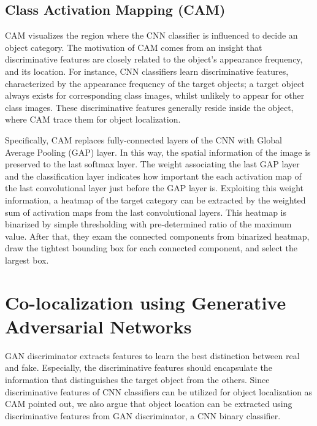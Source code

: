 \documentclass[runningheads]{llncs}
\begin{document}
\subsection{Class Activation Mapping (CAM)}

CAM \cite{zhou2016learning} visualizes the region where the CNN classifier is influenced to decide an object category. The motivation of CAM comes from an insight that discriminative features are closely related to the object's appearance frequency, and its location. For instance, CNN classifiers learn discriminative features, characterized by the appearance frequency of the target objects; a target object always exists for corresponding class images, whilst unlikely to appear for other class images. These discriminative features generally reside inside the object, where CAM trace them for object localization.

Specifically, CAM replaces fully-connected layers of the CNN with Global Average Pooling (GAP) layer. In this way, the spatial information of the image is preserved to the last softmax layer. The weight associating the last GAP layer and the classification layer indicates how important the each activation map of the last convolutional layer just before the GAP layer is. Exploiting this weight information, a heatmap of the target category can be extracted by the weighted sum of activation maps from the last convolutional layers. This heatmap is binarized by simple thresholding with pre-determined ratio of the maximum value. After that, they exam the connected components from binarized heatmap, draw the tightest bounding box for each connected component, and select the largest box. 


\section{Co-localization using Generative Adversarial Networks}
\label{sec:methods}
GAN discriminator extracts features to learn the best distinction between real and fake. Especially, the discriminative features should encapsulate the information that distinguishes the target object from the others. Since discriminative features of CNN classifiers can be utilized for object localization as CAM \cite{zhou2016learning} pointed out, we also argue that object location can be extracted using discriminative features from GAN discriminator, a CNN binary classifier. 
\end{document}
